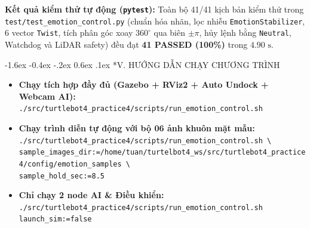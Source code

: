 \documentclass[10pt,a4paper]{article}
\makeatletter
\renewcommand{\section}{\@startsection{section}{1}{\z@}%
  {-1.6ex \@plus -0.4ex \@minus -.2ex}%
  {0.6ex \@plus .1ex}%
  {\normalfont\normalsize\bfseries\color{primary}}}
\makeatother
\begin{document}
\textbf{Kết quả kiểm thử tự động (\texttt{pytest}):} Toàn bộ 41/41 kịch bản kiểm thử trong \texttt{test/test\_emotion\_control.py} (chuẩn hóa nhãn, lọc nhiễu \texttt{EmotionStabilizer}, 6 vector \texttt{Twist}, tích phân góc xoay $360^\circ$ qua biên $\pm\pi$, hủy lệnh bằng \texttt{Neutral}, Watchdog và LiDAR safety) đều đạt \textbf{41 PASSED (100\%)} trong $4.90\text{ s}$.

\section*{V. HƯỚNG DẪN CHẠY CHƯƠNG TRÌNH}
\begin{itemize}[leftmargin=14pt, itemsep=2pt, topsep=2pt]
  \item \textbf{Chạy tích hợp đầy đủ (Gazebo + RViz2 + Auto Undock + Webcam AI):}\\
  {\footnotesize\texttt{./src/turtlebot4\_practice4/scripts/run\_emotion\_control.sh}}
  \item \textbf{Chạy trình diễn tự động với bộ 06 ảnh khuôn mặt mẫu:}\\
  {\footnotesize\texttt{./src/turtlebot4\_practice4/scripts/run\_emotion\_control.sh \textbackslash}\\
  \texttt{\quad sample\_images\_dir:=/home/tuan/turtelbot4\_ws/src/turtlebot4\_practice4/config/emotion\_samples \textbackslash}\\
  \texttt{\quad sample\_hold\_sec:=8.5}}
  \item \textbf{Chỉ chạy 2 node AI \& Điều khiển:}\\
  {\footnotesize\texttt{./src/turtlebot4\_practice4/scripts/run\_emotion\_control.sh launch\_sim:=false}}
\end{itemize}
\end{document}
